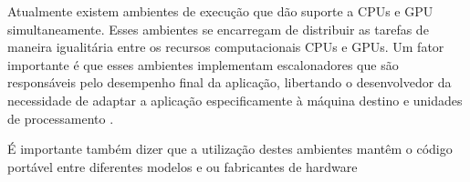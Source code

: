Atualmente existem ambientes de execução que dão suporte a CPUs e GPU simultaneamente.
Esses ambientes se encarregam de distribuir as tarefas de maneira igualitária entre os recursos computacionais CPUs e GPUs.
Um fator importante é que esses ambientes implementam escalonadores que são responsáveis pelo desempenho final da aplicação, libertando o desenvolvedor da necessidade de adaptar
a aplicação especificamente à máquina destino e unidades de processamento \cite{kumar:tel-01538516}.

É importante também dizer que a utilização destes ambientes mantêm o código portável entre diferentes modelos e ou fabricantes de hardware  
